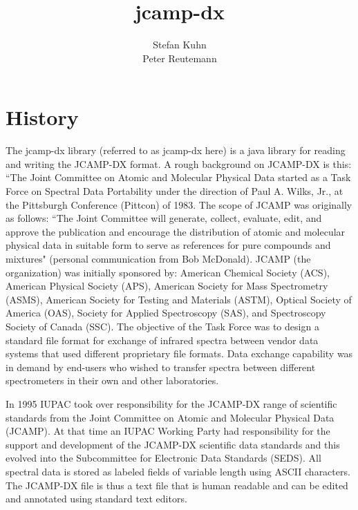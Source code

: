 \documentclass[a4paper]{book}
\title{
  {\Large \textbf{jcamp-dx}}
}
\author{
  Stefan Kuhn \\
  Peter Reutemann
}
\begin{document}
\begin{titlepage}
\maketitle

\end{titlepage}

\tableofcontents

\chapter{History}

The jcamp-dx library (referred to as jcamp-dx here) is a java library for reading and writing the JCAMP-DX format. A rough background on JCAMP-DX is this: ``The Joint Committee on Atomic and Molecular Physical Data started as a Task Force on Spectral Data Portability under the direction of Paul A. Wilks, Jr., at the
Pittsburgh Conference (Pittcon) of 1983. The scope of JCAMP was originally as follows: ``The Joint Committee will generate, collect, evaluate, edit, and approve the publication and encourage the distribution of atomic and molecular physical data in suitable form to serve as references for pure compounds and mixtures" (personal
communication from Bob McDonald). JCAMP (the organization) was initially sponsored by: American Chemical Society (ACS), American Physical Society (APS), American Society for Mass Spectrometry (ASMS), American Society for Testing and Materials (ASTM), Optical Society of America (OAS), Society for Applied Spectroscopy (SAS), and Spectroscopy Society of Canada (SSC). The objective of the Task Force
was to design a standard file format for exchange of infrared spectra between vendor data systems that used different proprietary file formats. Data exchange capability was in demand by end-users who wished to transfer spectra between different spectrometers in their own and other laboratories.

In 1995 IUPAC took over responsibility for the JCAMP-DX range of scientific standards from the Joint Committee on Atomic and Molecular Physical Data (JCAMP). At that time an IUPAC Working Party had responsibility for the support and development of the JCAMP-DX scientific data standards and this evolved into the Subcommittee for Electronic Data Standards (SEDS). All spectral data is stored as labeled fields of variable length using ASCII characters. The JCAMP-DX file is thus a text file that is human readable and can be edited and annotated using standard
text editors.
\end{document}
